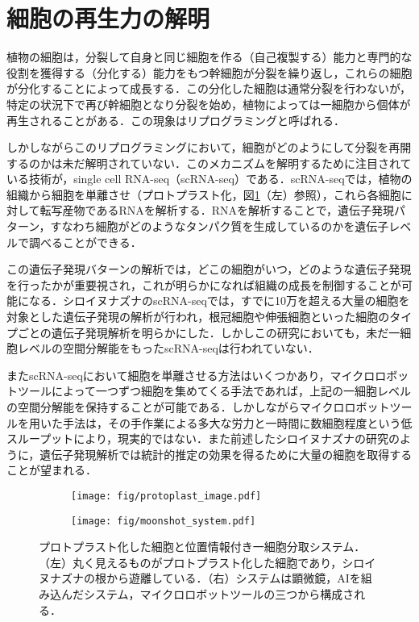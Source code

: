 \thispagestyle{fancy2}

\section{細胞の再生力の解明}
\label{sec:regeneration}

植物の細胞は，分裂して自身と同じ細胞を作る（自己複製する）能力と専門的な役割を獲得する（分化する）能力をもつ幹細胞が分裂を繰り返し，これらの細胞が分化することによって成長する\cite{sakamoto2022transcriptional}．この分化した細胞は通常分裂を行わないが，特定の状況下で再び幹細胞となり分裂を始め，植物によっては一細胞から個体が再生されることがある．この現象はリプログラミングと呼ばれる．

しかしながらこのリプログラミングにおいて，細胞がどのようにして分裂を再開するのかは未だ解明されていない．このメカニズムを解明するために注目されている技術が，single cell RNA-seq（scRNA-seq）\cite{kolodziejczyk2015technology}である．scRNA-seqでは，植物の組織から細胞を単離させ（プロトプラスト化\cite{pasternak2020single}，図\ref{fig:protoplast_and_main_system}（左）参照），これら各細胞に対して転写産物であるRNAを解析する．RNAを解析することで，遺伝子発現パターン，すなわち細胞がどのようなタンパク質を生成しているのかを遺伝子レベルで調べることができる\cite{xiao2012transcriptome,sakamoto2022transcriptional}．

この遺伝子発現バターンの解析では，どこの細胞がいつ，どのような遺伝子発現を行ったかが重要視され，これが明らかになれば組織の成長を制御することが可能になる．シロイヌナズナのscRNA-seq\cite{shahan2022single}では，すでに10万を超える大量の細胞を対象とした遺伝子発現の解析が行われ，根冠細胞や伸張細胞といった細胞のタイプごとの遺伝子発現解析を明らかにした．しかしこの研究においても，未だ一細胞レベルの空間分解能をもったscRNA-seqは行われていない．

またscRNA-seqにおいて細胞を単離させる方法はいくつかあり\cite{kolodziejczyk2015technology}，マイクロロボットツールによって一つずつ細胞を集めてくる手法であれば，上記の一細胞レベルの空間分解能を保持することが可能である．しかしながらマイクロロボットツールを用いた手法は，その手作業による多大な労力と一時間に数細胞程度という低スループットにより，現実的ではない．また前述したシロイヌナズナの研究のように，遺伝子発現解析では統計的推定の効果を得るために大量の細胞を取得することが望まれる．

\begin{figure}[t]
    \centering
    \begin{subfigure}[t]{0.27\linewidth}
        \centering
        \texttt{[image: fig/protoplast\_image.pdf]}
    \end{subfigure}
    \hfill
    \begin{subfigure}[t]{0.67\linewidth}
        \centering
        \texttt{[image: fig/moonshot\_system.pdf]}
    \end{subfigure}
    \caption[プロトプラスト化した細胞と位置情報付き一細胞分取システム]{プロトプラスト化した細胞と位置情報付き一細胞分取システム．（左）丸く見えるものがプロトプラスト化した細胞であり，シロイヌナズナの根から遊離している．（右）システムは顕微鏡，AIを組み込んだシステム，マイクロロボットツールの三つから構成される．}
    \label{fig:protoplast_and_main_system}
\end{figure}

